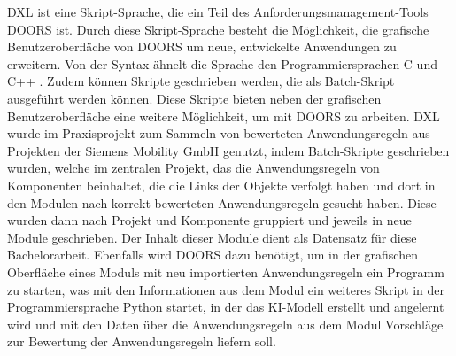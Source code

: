 \ac{DXL} ist eine Skript-Sprache, die ein Teil des Anforderungsmanagement-Tools \ac{DOORS} ist. Durch diese Skript-Sprache
besteht die Möglichkeit, die grafische Benutzeroberfläche von \ac{DOORS} um neue, entwickelte Anwendungen zu
erweitern. Von der Syntax ähnelt die Sprache den Programmiersprachen C und C++ \cite[vgl. S.1]{DXL}. Zudem können Skripte geschrieben werden,
die als Batch-Skript ausgeführt werden können. Diese Skripte bieten neben der grafischen Benutzeroberfläche eine weitere Möglichkeit, 
um mit \ac{DOORS} zu arbeiten. \ac{DXL} wurde im Praxisprojekt zum Sammeln von bewerteten Anwendungsregeln aus Projekten der Siemens Mobility GmbH 
genutzt, indem Batch-Skripte geschrieben wurden, welche im zentralen Projekt, das die Anwendungsregeln von Komponenten beinhaltet, die die Links der Objekte
verfolgt haben und dort in den Modulen nach korrekt bewerteten Anwendungsregeln gesucht haben. Diese wurden dann nach Projekt und Komponente gruppiert und 
jeweils in neue Module geschrieben. Der Inhalt dieser Module dient als Datensatz für diese Bachelorarbeit. Ebenfalls wird \ac{DOORS} dazu benötigt,
um in der grafischen Oberfläche eines Moduls mit neu importierten Anwendungsregeln ein Programm zu starten, was mit den Informationen aus dem Modul
ein weiteres Skript in der Programmiersprache Python startet, in der das KI-Modell erstellt und angelernt wird und mit den Daten über die Anwendungsregeln aus 
dem Modul Vorschläge zur Bewertung der Anwendungsregeln liefern soll.
